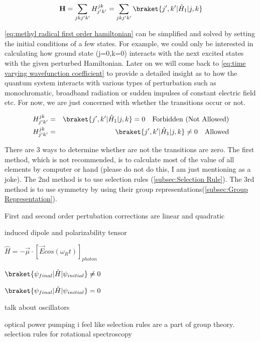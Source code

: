 \documentclass[11pt,a4paper]{book}
\begin{document}
			\begin{equation}
			\label{eq:methyl radical first order hamiltonian}
			\textbf{H} = \sum_{jkj'k'} H_{j'k'}^{jk} = \sum_{jkj'k'}\braket{j',k'| \hat{H}_1 |j, k}
			\end{equation}
			
			\noindent
			\autoref{eq:methyl radical first order hamiltonian} can be simplified and solved by setting the initial conditions of a few states. For example, we could only be interested in calculating how ground state (j=0,k=0) interacts with the next excited states with the given perturbed Hamiltonian. Later on we will come back to \autoref{eq:time varying wavefunction coefficient} to provide a detailed insight as to how the quantum system interacts with various types of perturbation such as monochromatic, broadband radiation or sudden impulses of constant electric field etc. For now, we are just concerned with whether the transitions occur or not.
			
			\begin{eqnarray*}
				H_{j'k'}^{jk} & = & \braket{j', k'| \hat{H}_1 |j, k} = 0 \quad \text{Forbidden (Not Allowed)}\\
				H_{j'k'}^{jk} & = & \braket{j', k'| \hat{H}_1 |j, k} \neq 0 \quad \text{Allowed}
			\end{eqnarray*}
			
			There are 3 ways to determine whether are not the transitions are zero. The first method, which is not recommended, is to calculate most of the value of all elements by computer or hand (please do not do this, I am just mentioning as a joke). The 2nd method is to use selection rules (\autoref{subsec:Selection Rule}). The 3rd method is to use symmetry by using their group representations(\autoref{subsec:Group Representation}).
			
			First and second order pertubation corrections are linear and quadratic
			
			induced dipole and polarizability tensor
			
			$\hat{H} = -\vec{\mu} \cdot [\vec{E}cos(\omega_R t)]_{photon}$
			
			$\braket{\psi_{final} |\hat{H} |\psi_{initial}} \neq 0$
			
			$\braket{\psi_{final} |\hat{H} |\psi_{initial}} = 0$
			
			talk about oscillators 
			
			optical power pumping
			\label{subsec:Selection Rule}
			i feel like selection rules are a part of group theory.
			selection rules for rotational spectroscopy
			
\end{document}
